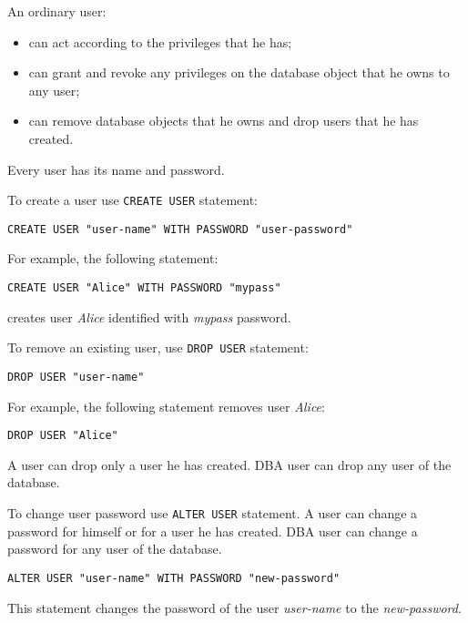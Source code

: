 \documentclass[a4paper,12pt]{article}
\newenvironment{citemize}
{\begin{itemize}
  \setlength{\itemsep}{0pt}
  \setlength{\parskip}{0pt}
  \setlength{\parsep}{0pt}}
{\end{itemize}}
\begin{document}
An ordinary user:
\begin{citemize}
\item can act according to the privileges that he has;
\item can grant and revoke any privileges on the database object that he owns
to any user;
\item can remove database objects that he owns and drop users that he has
created.
\end{citemize}

Every user has its name and password.

To create a user use \verb!CREATE USER! statement:

\begin{verbatim}
CREATE USER "user-name" WITH PASSWORD "user-password"
\end{verbatim}

For example, the following statement:

\begin{verbatim}
CREATE USER "Alice" WITH PASSWORD "mypass"
\end{verbatim}

creates user \emph{Alice} identified with \emph{mypass} password.

To remove an existing user, use \verb!DROP USER! statement:

\begin{verbatim}
DROP USER "user-name"
\end{verbatim}

For example, the following statement removes user \emph{Alice}:

\begin{verbatim}
DROP USER "Alice"
\end{verbatim}

A user can drop only a user he has created. DBA user can drop any user of the
database.

To change user password use \verb!ALTER USER! statement. A user can change a
password for himself or for a user he has created. DBA user can change a
password for any user of the database.

\begin{verbatim}
ALTER USER "user-name" WITH PASSWORD "new-password"
\end{verbatim}

This statement changes the password of the user \emph{user-name} to
the \emph{new-password}.


\end{document}
